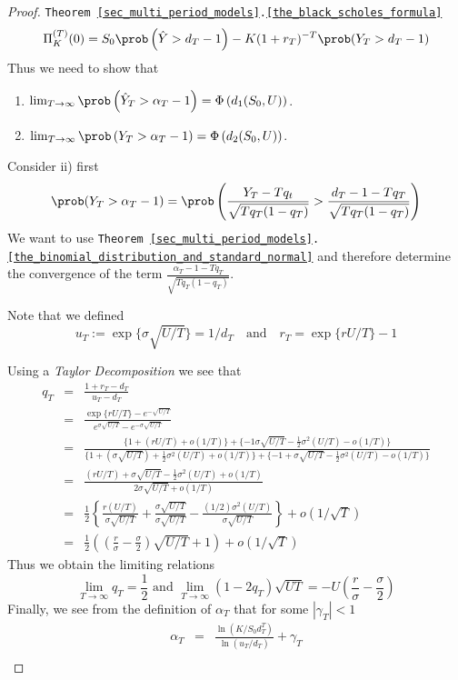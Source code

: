 \documentclass[11pt,a4paper]{article}
\begin{document}
\begin{proof}{\texttt{Theorem  \ref{sec_multi_period_models}.\ref{the_black_scholes_formula}}}
    \[ \Pi_K^{(T)}(0)=S_0\prob\left(\hat{Y}>d_T-1\right)-K(1+r_T)^{-T}\prob(Y_T>d_T-1) \]
    Thus we need to show that
    \begin{enumerate}
      \item $\lim_{T\to\infty}\prob\left(\hat{Y}_T>\alpha_T-1\right)=\Phi\left(d_1(S_0,U)\right)$.
      \item $\lim_{T\to\infty}\prob\left(Y_T>\alpha_T-1\right)=\Phi\left(d_2(S_0,U)\right)$.
    \end{enumerate}
    Consider ii) first
    \[ \prob(Y_T>\alpha_T-1)=\prob\left(\frac{Y_T-Tq_t}{\sqrt{Tq_T(1-q_T)}}>\frac{d_T-1-Tq_T}{\sqrt{Tq_T(1-q_T)}}\right) \]
    We want to use \texttt{Theorem \ref{sec_multi_period_models}.\ref{the_binomial_distribution_and_standard_normal}} and therefore determine the convergence of the term $\frac{\alpha_T-1-Tq_T}{\sqrt{Tq_T(1-q_T)}}$.
    \par Note that we defined
    \[ u_T:=\exp\{\sigma\sqrt{U/T}\}=1/d_T\quad\text{and}\quad r_T=\exp\{rU/T\}-1 \]
    \par Using a \textit{Taylor Decomposition} we see that
    \[\begin{array}{rcl}
      q_T&=&\frac{1+r_T-d_T}{u_T-d_T}\\
      &=&\frac{\exp\{rU/T\}-e^{-\sqrt{U/T}}}{e^{\sigma\sqrt{U/T}}-e^{-\sigma\sqrt{U/T}}}\\
      &=&\frac{\{1+(rU/T)+o(1/T)\}  +\{-1\sigma\sqrt{U/T}-\frac12\sigma^2(U/T)-o(1/T)\}}{\{1+(\sigma\sqrt{U/T})+\frac12\sigma^2(U/T)+o(1/T)\}+\{-1+\sigma\sqrt{U/T}-\frac12\sigma^2(U/T)-o(1/T)\}}\\
      &=&\frac{(rU/T)+\sigma\sqrt{U/T}-\frac12\sigma^2(U/T)+o(1/T)}{2\sigma\sqrt{U/T}+o(1/T)}\\
      &=&\frac12\left\{\frac{r(U/T)}{\sigma\sqrt{U/T}}+\frac{\sigma\sqrt{U/T}}{\sigma\sqrt{U/T}}-\frac{(1/2)\sigma^2(U/T)}{\sigma\sqrt{U/T}}\right\}+o(1/\sqrt{T})\\
      &=&\frac12\left(\left(\frac{r}\sigma-\frac\sigma2\right)\sqrt{U/T}+1\right)+o(1/\sqrt{T})
    \end{array}\]
    Thus we obtain the limiting relations
    \[ \lim_{T\to\infty}q_T=\frac12\text{ and }\lim_{T\to\infty}(1-2q_T)\sqrt{UT}=-U\left(\frac{r}{\sigma}-\frac\sigma2\right) \]
    Finally, we see from the definition of $\alpha_T$ that for some $|\gamma_T|<1$
    \[\begin{array}{rcl}
      \alpha_T&=&\frac{\ln(K/S_0d_T^T)}{\ln(u_T/d_T)}+\gamma_T\\

\end{array}\]
\end{proof}
\end{document}
